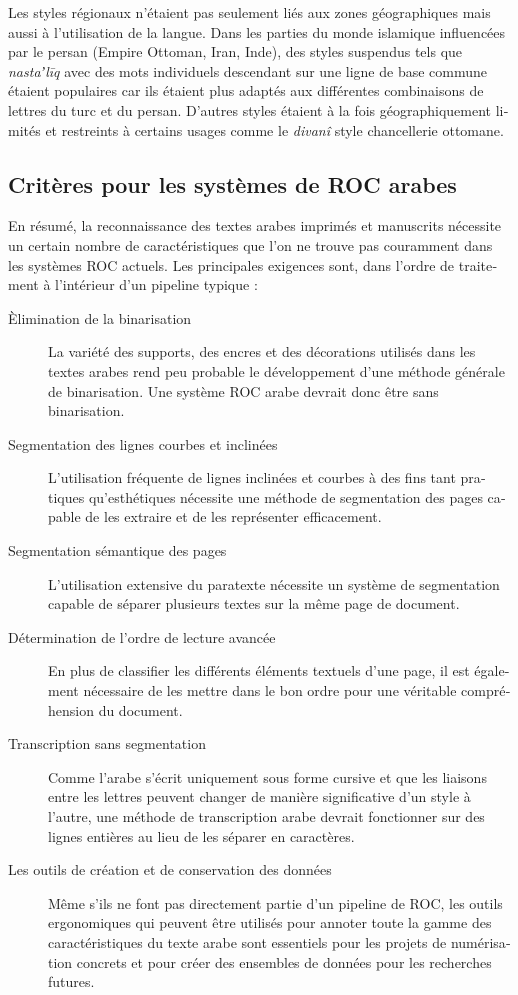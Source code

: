 \begin{french}
Les styles régionaux n'étaient pas seulement liés aux zones géographiques mais
aussi à l'utilisation de la langue.  Dans les parties du monde islamique
influencées par le persan (Empire Ottoman, Iran, Inde), des styles suspendus
tels que \emph{nastaʼlīq} avec des mots individuels descendant sur une ligne de
base commune étaient populaires car ils étaient plus adaptés aux différentes
combinaisons de lettres du turc et du persan. D'autres styles étaient à la fois
géographiquement limités et restreints à certains usages comme le
\emph{divanî} style chancellerie ottomane.

\subsection{Critères pour les systèmes de ROC arabes}

En résumé, la reconnaissance des textes arabes imprimés et manuscrits nécessite
un certain nombre de caractéristiques que l'on ne trouve pas couramment dans
les systèmes ROC actuels. Les principales exigences sont, dans l'ordre de
traitement à l'intérieur d'un pipeline typique :

\begin{description}
	\item[Èlimination de la binarisation] La variété des supports, des encres et des décorations utilisés
		dans les textes arabes rend peu probable le développement d'une
		méthode générale de binarisation. Une système ROC arabe devrait
		donc être sans binarisation.
	\item[Segmentation des lignes courbes et inclinées] L'utilisation
		fréquente de lignes inclinées et courbes à des fins tant
		pratiques qu'esthétiques nécessite une méthode de segmentation
		des pages capable de les extraire et de les représenter
		efficacement.
	\item[Segmentation sémantique des pages] L'utilisation extensive du
		paratexte nécessite un système de segmentation capable de
		séparer plusieurs textes sur la même page de document.
	\item[Détermination de l'ordre de lecture avancée] En plus de
		classifier les différents éléments textuels d'une page, il est
		également nécessaire de les mettre dans le bon ordre pour une
		véritable compréhension du document.
	\item[Transcription sans segmentation] Comme l'arabe s'écrit uniquement
		sous forme cursive et que les liaisons entre les lettres
		peuvent changer de manière significative d'un style à l'autre,
		une méthode de transcription arabe devrait fonctionner sur des
		lignes entières au lieu de les séparer en caractères.
	\item[Les outils de création et de conservation des données]
		Même s'ils ne font pas directement partie d'un pipeline de ROC,
		les outils ergonomiques qui peuvent être utilisés pour annoter
		toute la gamme des caractéristiques du texte arabe sont
		essentiels pour les projets de numérisation concrets et pour
		créer des ensembles de données pour les recherches futures.
\end{description}


\end{french}
